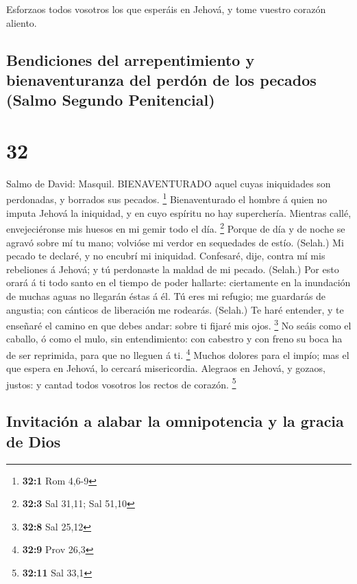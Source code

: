  Esforzaos todos vosotros los que esperáis en Jehová, y
tome vuestro corazón aliento.

\hypertarget{bendiciones-del-arrepentimiento-y-bienaventuranza-del-perduxf3n-de-los-pecados-salmo-segundo-penitencial}{%
\subsection{Bendiciones del arrepentimiento y bienaventuranza del perdón
de los pecados (Salmo Segundo
Penitencial)}\label{bendiciones-del-arrepentimiento-y-bienaventuranza-del-perduxf3n-de-los-pecados-salmo-segundo-penitencial}}

\hypertarget{section-31}{%
\section{32}\label{section-31}}

 Salmo de David: Masquil. BIENAVENTURADO aquel cuyas
iniquidades son perdonadas, y borrados sus pecados. \footnote{\textbf{32:1}
  Rom 4,6-9}  Bienaventurado el hombre á quien no imputa
Jehová la iniquidad, y en cuyo espíritu no hay superchería. 
Mientras callé, envejeciéronse mis huesos en mi gemir todo el día.
\footnote{\textbf{32:3} Sal 31,11; Sal 51,10}  Porque de día
y de noche se agravó sobre mí tu mano; volvióse mi verdor en sequedades
de estío. (Selah.)  Mi pecado te declaré, y no encubrí mi
iniquidad. Confesaré, dije, contra mí mis rebeliones á Jehová; y tú
perdonaste la maldad de mi pecado. (Selah.)  Por esto orará
á ti todo santo en el tiempo de poder hallarte: ciertamente en la
inundación de muchas aguas no llegarán éstas á él.  Tú eres
mi refugio; me guardarás de angustia; con cánticos de liberación me
rodearás. (Selah.)  Te haré entender, y te enseñaré el
camino en que debes andar: sobre ti fijaré mis ojos. \footnote{\textbf{32:8}
  Sal 25,12}  No seáis como el caballo, ó como el mulo, sin
entendimiento: con cabestro y con freno su boca ha de ser reprimida,
para que no lleguen á ti. \footnote{\textbf{32:9} Prov 26,3}
 Muchos dolores para el impío; mas el que espera en Jehová,
lo cercará misericordia.  Alegraos en Jehová, y gozaos,
justos: y cantad todos vosotros los rectos de corazón. \footnote{\textbf{32:11}
  Sal 33,1}

\hypertarget{invitaciuxf3n-a-alabar-la-omnipotencia-y-la-gracia-de-dios}{%
\subsection{Invitación a alabar la omnipotencia y la gracia de
Dios}\label{invitaciuxf3n-a-alabar-la-omnipotencia-y-la-gracia-de-dios}}

